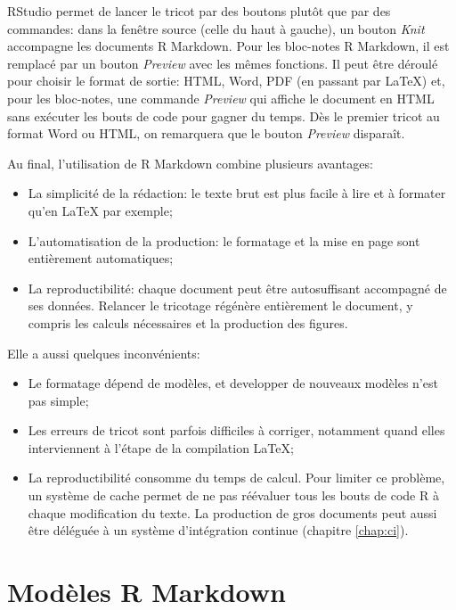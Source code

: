 \documentclass[
  12pt,
  french,
  a4paper,
  extrafontsizes,onecolumn,openright
  ]{memoir}
\providecommand{\tightlist}{%
  \setlength{\itemsep}{0pt}\setlength{\parskip}{0pt}}
\newlength{\rf}
\begin{document}
RStudio permet de lancer le tricot par des boutons plutôt que par des commandes: dans la fenêtre source (celle du haut à gauche), un bouton \emph{Knit} accompagne les documents R Markdown.
Pour les bloc-notes R Markdown, il est remplacé par un bouton \emph{Preview} avec les mêmes fonctions.
Il peut être déroulé pour choisir le format de sortie: HTML, Word, PDF (en passant par LaTeX) et, pour les bloc-notes, une commande \emph{Preview} qui affiche le document en HTML sans exécuter les bouts de code pour gagner du temps.
Dès le premier tricot au format Word ou HTML, on remarquera que le bouton \emph{Preview} disparaît.

Au final, l'utilisation de R Markdown combine plusieurs avantages:

\begin{itemize}
\tightlist
\item
  La simplicité de la rédaction: le texte brut est plus facile à lire et à formater qu'en LaTeX par exemple;
\item
  L'automatisation de la production: le formatage et la mise en page sont entièrement automatiques;
\item
  La reproductibilité: chaque document peut être autosuffisant accompagné de ses données. Relancer le tricotage régénère entièrement le document, y compris les calculs nécessaires et la production des figures.
\end{itemize}

Elle a aussi quelques inconvénients:

\begin{itemize}
\tightlist
\item
  Le formatage dépend de modèles, et developper de nouveaux modèles n'est pas simple;
\item
  Les erreurs de tricot sont parfois difficiles à corriger, notamment quand elles interviennent à l'étape de la compilation LaTeX;
\item
  La reproductibilité consomme du temps de calcul. Pour limiter ce problème, un système de cache permet de ne pas réévaluer tous les bouts de code R à chaque modification du texte. La production de gros documents peut aussi être déléguée à un système d'intégration continue (chapitre \ref{chap:ci}).
\end{itemize}

\hypertarget{moduxe8les-r-markdown}{%
\section{Modèles R Markdown}\label{moduxe8les-r-markdown}}
\end{document}
